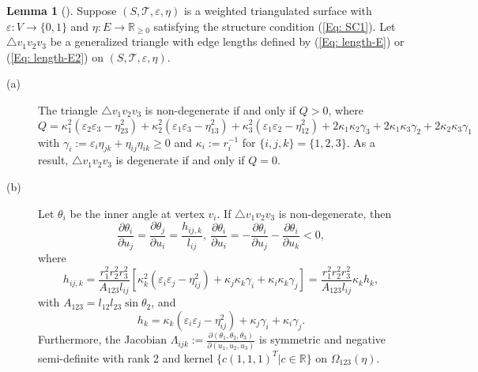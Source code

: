 \documentclass[12pt]{amsart}
\theoremstyle{definition}
\newtheorem{lemma}[theorem]{Lemma}
\begin{document}
\begin{lemma}[\cite{Xu 1}]\label{Lem: basic 1}
Suppose $(S,\mathcal{T},\varepsilon,\eta)$ is a weighted triangulated surface with $\varepsilon: V\rightarrow \{0,1\}$ and $\eta: E\rightarrow \mathbb{R}_{\geq 0}$ satisfying the structure condition  (\ref{Eq: SC1}).
Let $\triangle v_1v_2v_3$ be a generalized triangle with edge lengths defined by (\ref{Eq: length-E}) or (\ref{Eq: length-E2}) on $(S, \mathcal{T}, \varepsilon, \eta)$.
\begin{description}
\item[(a)]
The triangle $\triangle v_1v_2v_3$ is non-degenerate if and only if $Q>0$, where
\begin{equation}\label{Eq: Q}
Q=\kappa_1^2(\varepsilon_2\varepsilon_3-\eta^2_{23})
+\kappa_2^2(\varepsilon_1\varepsilon_3-\eta^2_{13})
+\kappa_3^2(\varepsilon_1\varepsilon_2-\eta^2_{12}) +2\kappa_1\kappa_2\gamma_{3}
+2\kappa_1\kappa_3\gamma_{2}
+2\kappa_2\kappa_3\gamma_{1}
\end{equation}
with $\gamma_{i}:=\varepsilon_i\eta_{jk}+\eta_{ij}\eta_{ik}\geq 0$ and $\kappa_i:=r_i^{-1}$ for $\{i,j,k\}=\{1,2,3\}$.
As a result, $\triangle v_1v_2v_3$ is degenerate if and only if $Q=0$.

\item[(b)]
Let $\theta_i$ be the inner angle at vertex $v_i$.
If $\triangle v_1v_2v_3$ is non-degenerate,
then
\begin{equation*}
\frac{\partial \theta_i}{\partial u_j}
=\frac{\partial \theta_j}{\partial u_i}
=\frac{h_{ij,k}}{l_{ij}},\
\frac{\partial \theta_i}{\partial u_i}
=-\frac{\partial \theta_i}{\partial u_j}
-\frac{\partial \theta_i}{\partial u_k}
<0,
\end{equation*}
where 
\begin{equation}\label{Eq: hij,k}
h_{ij,k}
=\frac{r_1^2r_2^2r_3^2}{A_{123}l_{ij}}
[\kappa_k^2(\varepsilon_i\varepsilon_j-\eta_{ij}^2)
+\kappa_j\kappa_k\gamma_{i}+\kappa_i\kappa_k\gamma_{j}]				=\frac{r_1^2r_2^2r_3^2}{A_{123}l_{ij}}\kappa_kh_k,
\end{equation}
with $A_{123}=l_{12}l_{23}\sin \theta_2$, and
\begin{equation}\label{Eq: h_i}						h_k=\kappa_k(\varepsilon_i\varepsilon_j-\eta_{ij}^2)
+\kappa_j\gamma_i+\kappa_i\gamma_j.
\end{equation}
Furthermore, the Jacobian $\Lambda_{ijk}:=\frac{\partial (\theta_1, \theta_2, \theta_3)}{\partial (u_1, u_2, u_3)}$ is symmetric and negative semi-definite with rank 2 and kernel $\{c(1,1,1)^T|c\in \mathbb{R} \}$ on $\Omega_{123}(\eta)$.


\end{description}
\end{lemma}
\end{document}
